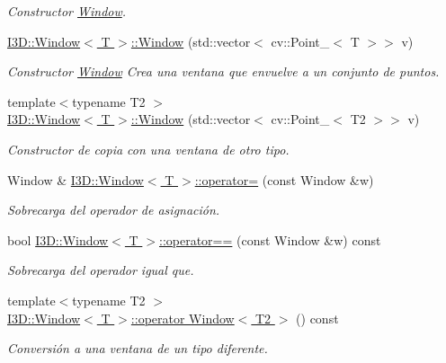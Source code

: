 \begin{DoxyCompactItemize}
\begin{DoxyCompactList}\small\item\em Constructor \hyperlink{class_i3_d_1_1_window}{Window}. \end{DoxyCompactList}\item 
\hyperlink{group___geometric_entities_gad423e12e78a18a2c6bcd65172d2808b7}{I3\+D\+::\+Window$<$ T $>$\+::\+Window} (std\+::vector$<$ cv\+::\+Point\+\_\+$<$ T $>$$>$ v)
\begin{DoxyCompactList}\small\item\em Constructor \hyperlink{class_i3_d_1_1_window}{Window} Crea una ventana que envuelve a un conjunto de puntos. \end{DoxyCompactList}\item 
{\footnotesize template$<$typename T2 $>$ }\\\hyperlink{group___geometric_entities_gac888172a38a99ccd02e28b48aa89007d}{I3\+D\+::\+Window$<$ T $>$\+::\+Window} (std\+::vector$<$ cv\+::\+Point\+\_\+$<$ T2 $>$$>$ v)
\begin{DoxyCompactList}\small\item\em Constructor de copia con una ventana de otro tipo. \end{DoxyCompactList}\item 
Window \& \hyperlink{group___geometric_entities_gaaaa9e4a378be69b62a9a8717c220d706}{I3\+D\+::\+Window$<$ T $>$\+::operator=} (const Window \&w)
\begin{DoxyCompactList}\small\item\em Sobrecarga del operador de asignación. \end{DoxyCompactList}\item 
bool \hyperlink{group___geometric_entities_gaa67dcb4334c42c92c1bbb98bca40baac}{I3\+D\+::\+Window$<$ T $>$\+::operator==} (const Window \&w) const 
\begin{DoxyCompactList}\small\item\em Sobrecarga del operador \textquotesingle{}igual que\textquotesingle{}. \end{DoxyCompactList}\item 
{\footnotesize template$<$typename T2 $>$ }\\\hyperlink{group___geometric_entities_ga0735f1f595e1d9feece5975ef4c886ce}{I3\+D\+::\+Window$<$ T $>$\+::operator Window$<$ T2 $>$} () const 
\begin{DoxyCompactList}\small\item\em Conversión a una ventana de un tipo diferente. \end{DoxyCompactList}\item 

\end{DoxyCompactItemize}
